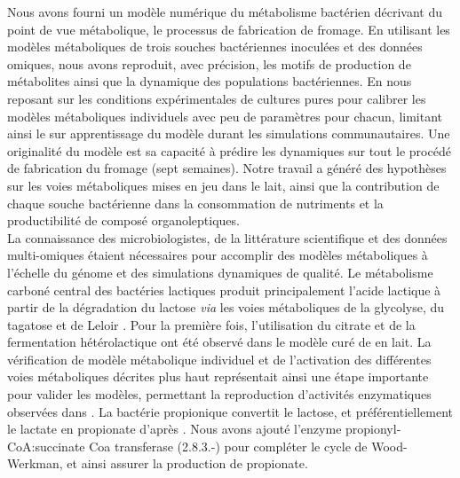 Nous avons fourni un modèle numérique du métabolisme bactérien décrivant du point de vue métabolique, le processus de fabrication de fromage. En utilisant les modèles métaboliques de trois souches bactériennes inoculées et des données omiques, nous avons reproduit, avec précision, les motifs de production de métabolites ainsi que la dynamique des populations bactériennes. En nous reposant sur les conditions expérimentales de cultures pures pour calibrer les modèles métaboliques individuels avec peu de paramètres pour chacun, limitant ainsi le sur apprentissage du modèle durant les simulations communautaires. Une originalité du modèle est sa capacité à prédire les dynamiques sur tout le procédé de fabrication du fromage (sept semaines). Notre travail a généré des hypothèses sur les voies métaboliques mises en jeu dans le lait, ainsi que la contribution de chaque souche bactérienne dans la consommation de nutriments et la productibilité de composé organoleptiques. \\

La connaissance des microbiologistes, de la littérature scientifique et des données multi-omiques étaient nécessaires pour accomplir des modèles métaboliques à l'échelle du génome et des simulations dynamiques de qualité. Le métabolisme carboné central des bactéries lactiques produit principalement l'acide lactique à partir de la dégradation du lactose \textit{via} les voies métaboliques de la glycolyse, du tagatose et de Leloir \citep{Widyastuti2014,VanRooijen1991,Kleerebezem2003}. Pour la première fois, l'utilisation du citrate et de la fermentation hétérolactique ont été observé dans le modèle curé de \plantarum en lait. La vérification de modèle métabolique individuel et de l'activation des différentes voies métaboliques décrites plus haut représentait ainsi une étape importante pour valider les modèles, permettant la reproduction d'activités enzymatiques observées dans \citep{Quatravaux2006,Carroll1999}. La bactérie propionique \freud convertit le lactose, et préférentiellement le lactate en propionate d'après \citep{Loux2015,Thierry2011,Borghei2021}. Nous avons ajouté l'enzyme propionyl-CoA:succinate Coa transferase (2.8.3.-) pour compléter le cycle de Wood-Werkman, et ainsi assurer la production de propionate.

